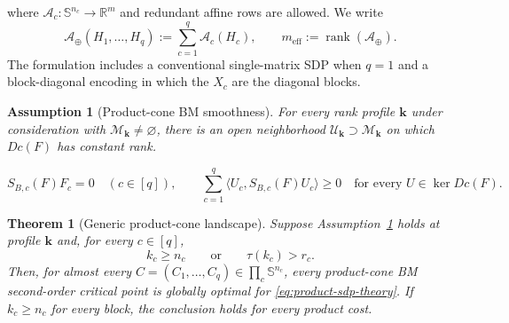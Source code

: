 \documentclass[10pt,a4paper]{amsart}
\newtheorem{assumption}{Assumption}
\newtheorem{theorem}{Theorem}
\begin{document}
where $\mathcal A_c:\mathbb S^{n_c}\to\mathbb R^m$ and redundant affine
rows are allowed.  We write
\[
  \mathcal A_\oplus(H_1,\ldots,H_q)
  :=\sum_{c=1}^q\mathcal A_c(H_c),
  \qquad
  m_{\mathrm{eff}}:=\operatorname{rank}(\mathcal A_\oplus).
\]
The formulation includes a conventional single-matrix SDP when $q=1$ and a
block-diagonal encoding in which the $X_c$ are the diagonal blocks.

\begin{assumption}[Product-cone BM smoothness]
\label{ass:bm-geometry}
For every rank profile $\mathbf k$ under consideration with
$\mathcal M_{\mathbf k}\neq\varnothing$, there is an open neighborhood
$\mathcal U_{\mathbf k}\supset\mathcal M_{\mathbf k}$ on which $Dc(F)$ has
constant rank.
\end{assumption}

\begin{equation}
  S_{B,c}(F)F_c=0\quad(c\in[q]),
  \qquad
  \sum_{c=1}^q\langle U_c,S_{B,c}(F)U_c\rangle\geq0
  \quad\text{for every }U\in\ker Dc(F).
  \label{eq:product-bm-sosp}
\end{equation}

\begin{theorem}[Generic product-cone landscape]
\label{thm:product-generic-landscape}
Suppose Assumption~\ref{ass:bm-geometry} holds at profile $\mathbf k$ and,
for every $c\in[q]$,
\begin{equation}
  k_c\geq n_c
  \qquad\text{or}\qquad
  \tau(k_c)>r_c.
  \label{eq:product-generic-rank-condition}
\end{equation}
Then, for almost every
$C=(C_1,\ldots,C_q)\in\prod_c\mathbb S^{n_c}$, every product-cone BM
second-order critical point is globally optimal for
\eqref{eq:product-sdp-theory}.  If $k_c\geq n_c$ for every block, the
conclusion holds for every product cost.
\end{theorem}
\end{document}
